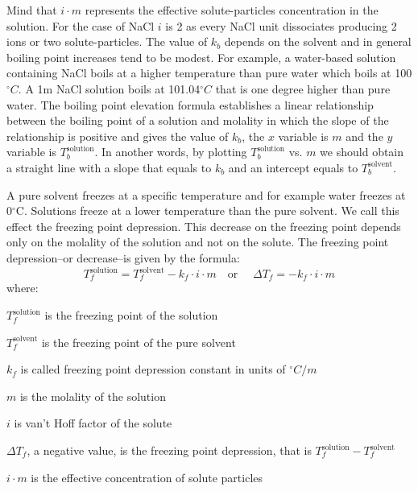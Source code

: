 \documentclass[main.tex]{subfiles}
\newcommand\chapterlabel{physicalsolutions}
\begin{document}
\begin{description}
\begin{where}
\end{where}
Mind that $i\cdot m$ represents the effective solute-particles concentration in the solution. For the case of NaCl $i$ is 2 as every NaCl unit dissociates producing 2 ions or two solute-particles. The value of $k_b$ depends on the solvent and in general boiling point increases tend to be modest. For example, a water-based solution containing NaCl boils at a higher temperature than pure water which boils at 100$^{\circ}C$. A 1m NaCl solution boils at 101.04$^{\circ}C$ that is one degree higher than pure water.
The boiling point elevation formula establishes a linear relationship between the boiling point of a solution and molality in which the slope of the relationship is positive and gives the value of $k_b$, the $x$ variable is $m$ and the $y$ variable is $T_b^{\text{solution}}$. In another words, by plotting $T_b^{\text{solution}}$ vs. $m$ we should obtain a straight line with a slope that equals to $k_b$ and an intercept equals to $T_b^{\text{solvent}}$.
\item[\docfilehook{Freezing point depression}{}] 
A pure solvent freezes at a specific temperature and for example water freezes at 0$^{\circ}$C. Solutions freeze at a lower temperature than the pure solvent. We call this effect the freezing point depression. This decrease on the freezing point depends only on the molality of the solution and not on the solute. The freezing point depression--or decrease--is given by the formula:
\begin{equation}
\boxed{ T_f^{\text{solution}}=T_f^{\text{solvent}}-k_f\cdot i\cdot m 	}
\quad  \text{or }\quad 
\boxed{\Delta T_f =-k_f\cdot i\cdot m}
\label{\chapterlabel:equation11}
\end{equation}
where:
\begin{where}
 \item $T_f^{\text{solution}}$  is the freezing point of the solution
  \item $T_f^{\text{solvent}}$   is the freezing point of the pure solvent  
  \item $k_f$   is called freezing point depression constant in units of $^{\circ}C/m$
  \item $m$ is the molality of the solution
      \item $i$ is van't Hoff factor of the solute
  \item $\Delta T_f$, a negative value, is the freezing point depression, that is $T_f^{\text{solution}}-T_f^{\text{solvent}}$
        \item $i\cdot m$ is the effective concentration of solute particles


\end{where}
\end{description}
\end{document}
